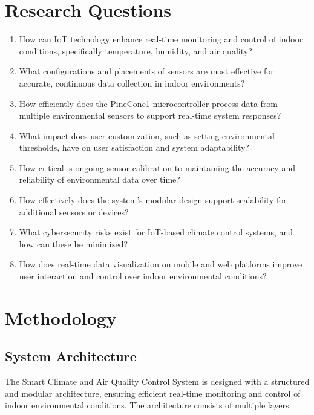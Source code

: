 \documentclass[a4paper]{scrartcl}
\begin{document}
\section{Research Questions}
\begin{enumerate}
    \item How can IoT technology enhance real-time monitoring and control of indoor conditions, specifically temperature, humidity, and air quality?
    \item What configurations and placements of sensors are most effective for accurate, continuous data collection in indoor environments?
    \item How efficiently does the PineCone1 microcontroller process data from multiple environmental sensors to support real-time system responses?
    \item What impact does user customization, such as setting environmental thresholds, have on user satisfaction and system adaptability?
    \item How critical is ongoing sensor calibration to maintaining the accuracy and reliability of environmental data over time?
    \item How effectively does the system’s modular design support scalability for additional sensors or devices?
    \item What cybersecurity risks exist for IoT-based climate control systems, and how can these be minimized?
    \item How does real-time data visualization on mobile and web platforms improve user interaction and control over indoor environmental conditions?
\end{enumerate}

\section{Methodology}

\subsection{System Architecture}
The Smart Climate and Air Quality Control System is designed with a structured and modular architecture, ensuring efficient real-time monitoring and control of indoor environmental conditions. The architecture consists of multiple layers:
\end{document}
